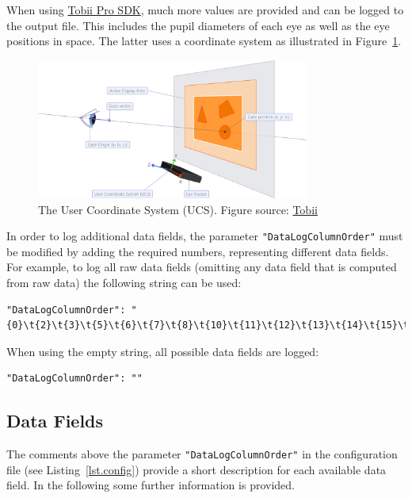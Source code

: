 \documentclass[a4paper,oneside]{book}
\begin{document}
When using \href{http://developer.tobii.com/tobii-pro-sdk/}{Tobii Pro SDK}, much more values are provided and can be logged to the output file.
This includes the pupil diameters of each eye as well as the eye positions in space.
The latter uses a coordinate system as illustrated in Figure~\ref{fig.ucs}.
\begin{figure}[ht]
    \centering
    \includegraphics[width=0.8\textwidth]{ucs.png}
    \caption{The User Coordinate System (UCS). Figure source: \href{http://developer.tobiipro.com/commonconcepts/coordinatesystems.html}{Tobii}}
    \label{fig.ucs}
\end{figure}

In order to log additional data fields, the parameter \texttt{"DataLogColumnOrder"} must be modified by adding the required numbers, representing different data fields.
For example, to log all raw data fields (omitting any data field that is computed from raw data) the following string can be used:
\begin{lstlisting}
"DataLogColumnOrder": "{0}\t{2}\t{3}\t{5}\t{6}\t{7}\t{8}\t{10}\t{11}\t{12}\t{13}\t{14}\t{15}\t{16}\t{17}\t{18}\t{19}\t{23}\t{24}"
\end{lstlisting}

When using the empty string, all possible data fields are logged:
\begin{lstlisting}
"DataLogColumnOrder": ""
\end{lstlisting}

\subsection{Data Fields}
The comments above the parameter \texttt{"DataLogColumnOrder"} in the configuration file (see Listing~\ref{lst.config}) provide a short description for each available data field.
In the following some further information is provided.
\end{document}
